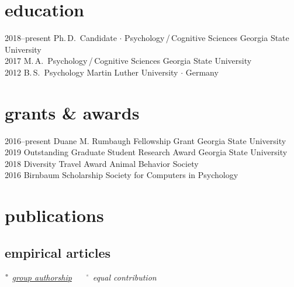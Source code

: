 \documentclass[]{friggeri-cv}
\begin{document}
\section{education}

\begin{entrylist}
  \entry
    {2018--present}
    {Ph.\,D.~Candidate $\cdot$ Psychology\,/\,Cognitive Sciences}
    {Georgia State University}
    {\\[-.3cm]}
 \entry
   {2017}
   {M.\,A.~Psychology\,/\,Cognitive Sciences}
   {Georgia State University}
   {\\[-.3cm]}
  \entry
    {2012}
    {B.\,S.~Psychology}
    {Martin Luther University $\cdot$ Germany}
    {\\[-.3cm]}
\end{entrylist}


\section{grants \& awards}

\begin{entrylist}
  \entry
    {2016--present}
    {Duane M. Rumbaugh Fellowship Grant}
    {Georgia State University}
    {\\[-.3cm]}
  \entry
    {2019}
    {Outstanding Graduate Student Research Award}
    {Georgia State University}
    {\\[-.3cm]}
  \entry
    {2018}
    {Diversity Travel Award}
    {Animal Behavior Society}
    {\\[-.3cm]}
  \entry
    {2016}
    {Birnbaum Scholarship}
    {Society for Computers in Psychology}
    {\\[-.3cm]}
\end{entrylist}



\section{publications}


\subsection{empirical articles}
\vspace{-.1cm}\hspace{.7cm}
{\small{} $\color{lightgray} {}^\bullet$ \emph{\color{lightgray} \ul{group authorship}} $\quad$ %
{\normalsize $\color{lightgray} {}^\star$} \emph{\color{lightgray} equal contribution}}\\[.5cm]
\end{document}

